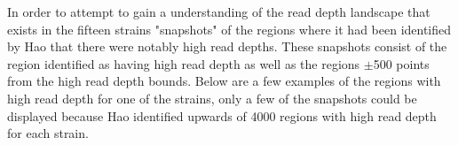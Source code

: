 \documentclass[../main.tex]{subfiles}
\begin{document}
%
%

In order to attempt to gain a understanding of the read depth landscape that exists in the fifteen strains "snapshots" of the regions where it had been identified by Hao that there were notably high read depths. These snapshots consist of the region identified as having high read depth as well as the regions $\pm$500 points from the high read depth bounds. Below are a few examples of the regions with high read depth for one of the strains, only a few of the snapshots could be displayed because Hao identified upwards of 4000 regions with high read depth for each strain.

\begin{figure}[H]
	\begin{centering}

\end{centering}
\end{figure}
\end{document}
